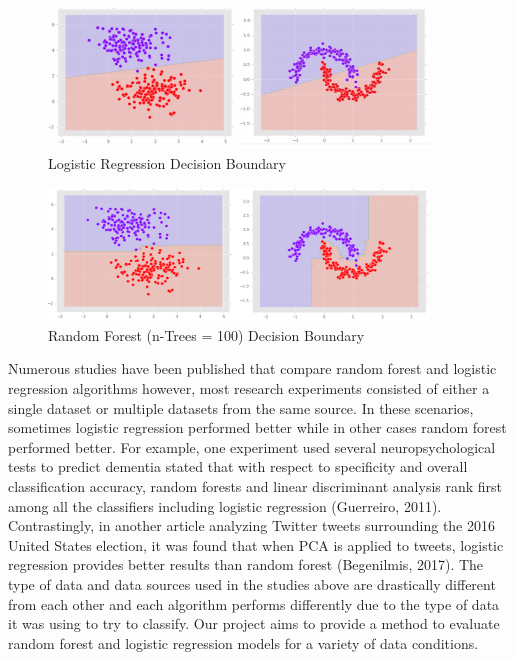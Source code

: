 \documentclass{llncs}
\begin{document}
\begin{figure}
\centering
\includegraphics[width=0.9\textwidth]{decisionboundary.png}
\caption{Logistic Regression Decision Boundary}
\end{figure}

\begin{figure}
\centering
\includegraphics[width=0.9\textwidth]{decisionboundary2.png}
\caption{Random Forest (n-Trees = 100) Decision Boundary}
\end{figure}


Numerous studies have been published that compare random forest and logistic regression algorithms however, most research experiments consisted of either a single dataset or multiple datasets from the same source. In these scenarios, sometimes logistic regression performed better while in other cases random forest performed better. For example, one experiment used several neuropsychological tests to predict dementia stated that with respect to specificity and overall classification accuracy, random forests and linear discriminant analysis rank first among all the classifiers including logistic regression (Guerreiro, 2011). Contrastingly, in another article analyzing Twitter tweets surrounding the 2016 United States election, it was found that when PCA is applied to tweets, logistic regression provides better results than random forest (Begenilmis, 2017). The type of data and data sources used in the studies above are drastically different from each other and each algorithm performs differently due to the type of data it was using to try to classify. Our project aims to provide a method to evaluate random forest and logistic regression models for a variety of data conditions.
\end{document}
